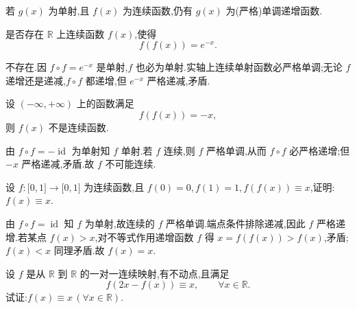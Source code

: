 \begin{corollary}[\markstar]
    若 $g(x)$ 为单射,且 $f(x)$ 为连续函数,仍有 $g(x)$ 为(严格)单调递增函数.
\end{corollary}

\begin{example}
    是否存在 $\mathbb{R}$ 上连续函数 $f(x)$,使得
    \[
        f(f(x))=e^{-x}.
    \]
\end{example}
\exampleblank

\begin{solution}
    不存在.因 $f\circ f=e^{-x}$ 是单射,$f$ 也必为单射.实轴上连续单射函数必严格单调;无论 $f$ 递增还是递减,$f\circ f$ 都递增,但 $e^{-x}$ 严格递减,矛盾.
\end{solution}

\begin{example}
    设 $(-\infty,+\infty)$ 上的函数满足
    \[
        f(f(x))=-x,
    \]
    则 $f(x)$ 不是连续函数.
\end{example}
\exampleblank

\begin{solution}
    由 $f\circ f=-\operatorname{id}$ 为单射知 $f$ 单射.若 $f$ 连续,则 $f$ 严格单调,从而 $f\circ f$ 必严格递增;但 $-x$ 严格递减,矛盾.故 $f$ 不可能连续.
\end{solution}

\begin{example}
    设 $f:\lbrack 0,1\rbrack\to\lbrack 0,1\rbrack$ 为连续函数,且 $f(0)=0,f(1)=1,f(f(x))\equiv x$,证明:$f(x)\equiv x$.
\end{example}
\exampleblank

\begin{solution}
    由 $f\circ f=\operatorname{id}$ 知 $f$ 为单射,故连续的 $f$ 严格单调.端点条件排除递减,因此 $f$ 严格递增.若某点 $f(x)>x$,对不等式作用递增函数 $f$ 得 $x=f(f(x))>f(x)$,矛盾;$f(x)<x$ 同理矛盾.故 $f(x)=x$.
\end{solution}

\begin{example}
    设 $f$ 是从 $\mathbb{R}$ 到 $\mathbb{R}$ 的一对一连续映射,有不动点,且满足
    \[
        f(2x-f(x))\equiv x,\qquad \forall x\in\mathbb{R}.
    \]
    试证:$f(x)\equiv x\,(\forall x\in\mathbb{R})$.
\end{example}
\exampleblank

